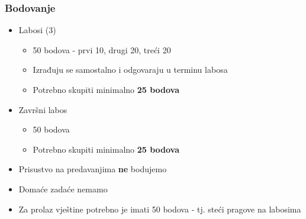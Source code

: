 \documentclass[t]{beamer}
\begin{document}
\begin{frame}
	\frametitle{Bodovanje}
	\begin{itemize}
		\item Labosi (3)
		\begin{itemize}
			\item 50 bodova - prvi 10, drugi 20, treći 20
			\item Izrađuju se samostalno i odgovaraju u terminu labosa
			\item Potrebno skupiti minimalno \textbf{25 bodova}
		\end{itemize}
		\item Završni labos
		\begin{itemize}
			\item 50 bodova
			\item Potrebno skupiti minimalno \textbf{25 bodova}
		\end{itemize}

		\item Prisustvo na predavanjima \textbf{ne} bodujemo
		\item Domaće zadaće nemamo
		\item Za prolaz vještine potrebno je imati 50 bodova - tj. steći pragove na labosima
	\end{itemize}
\end{frame}
\end{document}
